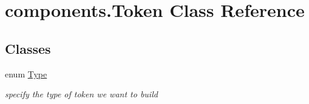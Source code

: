 \hypertarget{classcomponents_1_1_token}{}\section{components.\+Token Class Reference}
\label{classcomponents_1_1_token}
\subsection*{Classes}
\begin{DoxyCompactItemize}
\item 
enum \hyperlink{enumcomponents_1_1_token_1_1_type}{Type}
\begin{DoxyCompactList}\small\item\em specify the type of token we want to build \end{DoxyCompactList}\end{DoxyCompactItemize}
